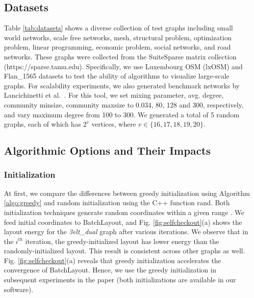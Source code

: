 \documentclass{vgtc}
\newcommand*{\myfont}{\fontfamily{lmtt}\selectfont}
\newcommand{\toolname}{{BatchLayout}}
\begin{document}
\subsection{Datasets}
\label{lab:datasets}
Table \ref{tab:datasets} shows a diverse collection of test graphs including small world networks, scale free networks, mesh, structural problem, optimization problem, linear programming, economic problem, social networks, and road networks. 
These graphs were collected from the SuiteSparse matrix collection (https://sparse.tamu.edu).
Specifically, we use Luxembourg OSM (lxOSM) and Flan\_1565 datasets to test the ability of algorithms to visualize large-scale graphs. 
For scalability experiments, we also generated benchmark networks by Lancichinetti et al.~\cite{lancichinetti2008benchmark}. 
For this tool, we set mixing parameter, avg. degree, community minsize, community maxsize to 0.034, 80, 128 and 300, respectively, and vary maximum degree from 100 to 300. 
We generated a total of 5 random graphs, each of which has $2^v$ vertices, where $v \in \{16, 17, 18, 19, 20\}$. 

\subsection{Algorithmic Options and Their Impacts}
\subsubsection{Initialization}
At first, we compare the differences between greedy initialization using Algorithm \ref{algo:greedy} and random initialization using the C++ function {\myfont rand}.
Both initialization techniques generate random coordinates within a given range {\myfont [-MAXMIN, MAXMIN]}.
We feed initial coordinates to \toolname{}, and Fig. \ref{fig:selfcheckout}(a) shows the layout energy for  the \emph{3elt\_dual} graph after various iterations. 
We observe that in the $i^{th}$ iteration, the greedy-initialized layout has lower energy than  the randomly-initialized layout.
This result is consistent across other graphs as well.
Fig. \ref{fig:selfcheckout}(a) reveals that greedy initialization accelerates the convergence of \toolname{}.
Hence,  we use the greedy initialization in subsequent experiments in the paper (both initializations are available in our software).




\end{document}
